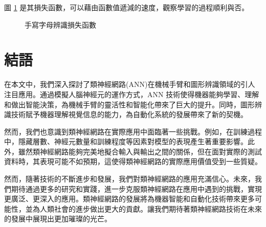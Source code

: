 圖 \ref{fig:手寫字母辨識損失函數} 是其損失函數，可以藉由函數值遞減的速度，觀察學習的過程順利與否。

\begin{figure}[H]
    \caption{手寫字母辨識損失函數}
    \label{fig:手寫字母辨識損失函數}
\end{figure}
\section{結語}
在本文中，我們深入探討了類神經網路(ANN)在機械手臂和圖形辨識領域的引人注目應用。通過模擬人腦神經元的運作方式，ANN 技術使得機器能夠學習、理解和做出智能決策，為機械手臂的靈活性和智能化帶來了巨大的提升。同時，圖形辨識技術賦予機器理解視覺信息的能力，為自動化系統的發展帶來了新的契機。

然而，我們也意識到類神經網路在實際應用中面臨著一些挑戰。例如，在訓練過程中，隱藏層數、神經元數量和訓練程度等因素對模型的表現產生著重要影響。此外，雖然類神經網路能夠完美地擬合輸入與輸出之間的關係，但在面對實際的測試資料時，其表現可能不如預期，這使得類神經網路的實際應用價值受到一些質疑。

然而，隨著技術的不斷進步和發展，我們對類神經網路的應用充滿信心。未來，我們期待通過更多的研究和實踐，進一步克服類神經網路在應用中遇到的挑戰，實現更廣泛、更深入的應用。類神經網路的發展將為機器智能和自動化技術帶來更多可能性，並為人類社會的進步做出更大的貢獻。讓我們期待著類神經網路技術在未來的發展中展現出更加璀璨的光芒。



